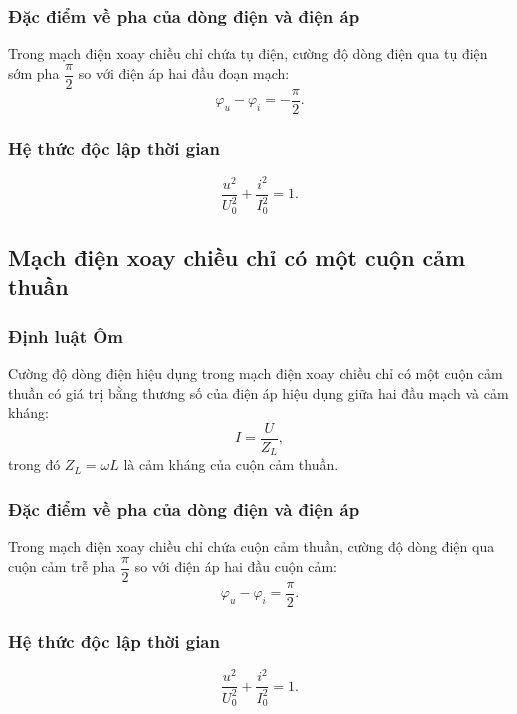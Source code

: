 \subsubsection{Đặc điểm về pha của dòng điện và điện áp}
Trong mạch điện xoay chiều chỉ chứa tụ điện, cường độ dòng điện qua tụ điện sớm pha $\dfrac{\pi}{2}$ so với điện áp hai đầu đoạn mạch:
\begin{equation*}
	\varphi_u - \varphi_i = -\dfrac{\pi}{2}.
\end{equation*}
\subsubsection{Hệ thức độc lập thời gian}
\begin{equation*}
	\dfrac{u^2}{U_0^2}+\dfrac{i^2}{I_0^2}=1.
\end{equation*}
\subsection{Mạch điện xoay chiều chỉ có một cuộn cảm thuần}
\subsubsection{Định luật Ôm}
Cường độ dòng điện hiệu dụng trong mạch điện xoay chiều chỉ có một cuộn cảm thuần có giá trị bằng thương số của điện áp hiệu dụng giữa hai đầu mạch và cảm kháng:
\begin{equation*}
	I = \dfrac{U}{Z_L},
\end{equation*}
trong đó $Z_L =\omega L$ là cảm kháng của cuộn cảm thuần.
\subsubsection{Đặc điểm về pha của dòng điện và điện áp}
Trong mạch điện xoay chiều chỉ chứa cuộn cảm thuần, cường độ dòng điện qua cuộn cảm trễ pha $\dfrac{\pi}{2}$ so với điện áp hai đầu cuộn cảm:
\begin{equation*}
	\varphi_u - \varphi_i = \dfrac{\pi}{2}.
\end{equation*}
\subsubsection{Hệ thức độc lập thời gian}
\begin{equation*}
	\dfrac{u^2}{U_0^2}+\dfrac{i^2}{I_0^2}=1.
\end{equation*}

